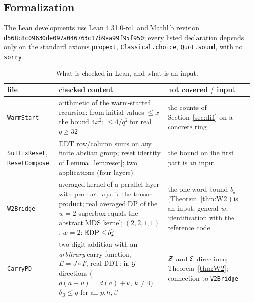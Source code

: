 \subsection{Formalization}
The Lean developments use Lean 4.31.0-rc1 and Mathlib revision
\texttt{d568c8c0}\allowbreak\texttt{9630de09}\allowbreak\texttt{7a046763}\allowbreak\texttt{c17b9ea9}\allowbreak\texttt{9f95f950}; every listed declaration depends only on the
standard axioms \texttt{propext}, \texttt{Classical.choice}, \texttt{Quot.sound}, with no \texttt{sorry}.
\begin{table}[!htbp]\footnotesize
\caption{What is checked in Lean, and what is an input.}\label{tab:lean}
\begin{tabular}{p{}p{}p{}}
\toprule
file & checked content & not covered / input\\
\midrule
\texttt{WarmStart} & arithmetic of the warm-started recursion: from initial values $\le x$ the bound $4x^2$; $\le4/q^2$ for real $q\ge32$ & the counts of Section~\ref{sec:diff} on a concrete ring\\
\texttt{SuffixReset}, \texttt{ResetCompose} & DDT row/column sums on any finite abelian group; reset identity of Lemma~\ref{lem:reset}; two applications (four layers) & the bound on the first part is an input\\
\texttt{W2Bridge} & averaged kernel of a parallel layer with product keys is the tensor product; real averaged DP of the $w=2$ superbox equals the abstract MDS kernel; $(2,2,1,1)$, $w=2$: $\mathbb{E}\mathrm{DP}\le b_\star^2$ & the one-word bound $b_\star$ (Theorem~\ref{thm:W2}) is an input; general $w$; identification with the reference code\\
\texttt{CarryPD} & two-digit addition with an \emph{arbitrary} carry function, $B=J\circ F$, real DDT: in $\mathcal{G}$ directions ($d(a+u)=d(a)+k$, $k\ne0$) $\delta_B\le q$ for all $p,h,\beta$ & $\mathcal{Z}$ and $\mathcal{E}$ directions; Theorem~\ref{thm:W2}; connection to \texttt{W2Bridge}\\
\bottomrule
\end{tabular}
\end{table}
